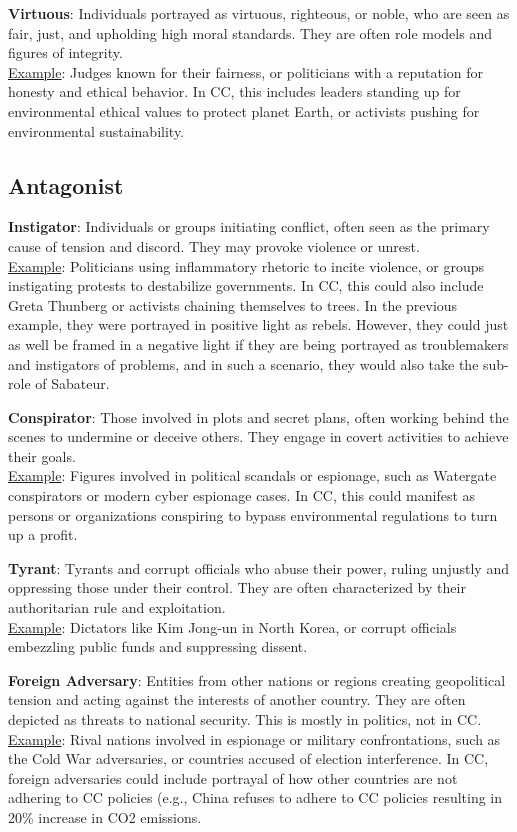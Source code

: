 \textbf{Virtuous}: Individuals portrayed as virtuous, righteous, or noble, who are seen as fair, just, and upholding high moral standards. They are often role models and figures of integrity.
\\\underline{Example}: Judges known for their fairness, or politicians with a reputation for honesty and ethical behavior. In CC, this includes leaders standing up for environmental ethical values to protect planet Earth, or activists pushing for environmental sustainability.


\subsection{Antagonist}

\textbf{Instigator}: Individuals or groups initiating conflict, often seen as the primary cause of tension and discord. They may provoke violence or unrest.
\\\underline{Example}: Politicians using inflammatory rhetoric to incite violence, or groups instigating protests to destabilize governments. In CC, this could also include Greta Thunberg or activists chaining themselves to trees. In the previous example, they were portrayed in positive light as rebels. However, they could just as well be framed in a negative light if they are being portrayed as troublemakers and instigators of problems, and in such a scenario, they would also take the sub-role of Sabateur.

\textbf{Conspirator}: Those involved in plots and secret plans, often working behind the scenes to undermine or deceive others. They engage in covert activities to achieve their goals.
\\\underline{Example}: Figures involved in political scandals or espionage, such as Watergate conspirators or modern cyber espionage cases. In CC, this could manifest as persons or organizations conspiring to bypass environmental regulations to turn up a profit. 

\textbf{Tyrant}: Tyrants and corrupt officials who abuse their power, ruling unjustly and oppressing those under their control. They are often characterized by their authoritarian rule and exploitation.
\\\underline{Example}: Dictators like Kim Jong-un in North Korea, or corrupt officials embezzling public funds and suppressing dissent. 

\textbf{Foreign Adversary}: Entities from other nations or regions creating geopolitical tension and acting against the interests of another country. They are often depicted as threats to national security. This is mostly in politics, not in CC.
\\\underline{Example}: Rival nations involved in espionage or military confrontations, such as the Cold War adversaries, or countries accused of election interference. In CC, foreign adversaries could include portrayal of how other countries are not adhering to CC policies (e.g., China refuses to adhere to CC policies resulting in 20\% increase in CO2 emissions.

